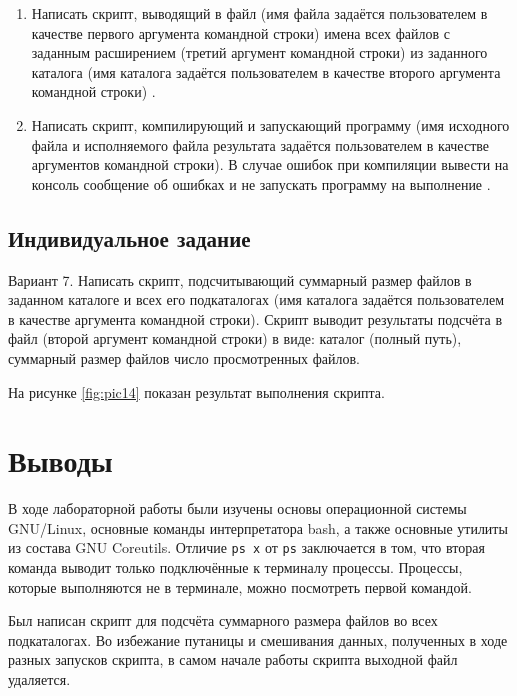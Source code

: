 \begin{enumerate}[listparindent=\fivecharsapprox]

	\item Написать скрипт, выводящий в файл (имя файла задаётся пользователем в качестве первого аргумента командной строки) имена всех файлов с заданным расширением (третий аргумент командной строки) из заданного каталога (имя каталога задаётся пользователем в качестве второго аргумента командной строки) .


	\item Написать скрипт, компилирующий и запускающий программу (имя исходного файла и исполняемого файла результата задаётся пользователем в качестве аргументов командной строки).
В случае ошибок при компиляции вывести на консоль сообщение об ошибках и не запускать программу на выполнение .


\end{enumerate}

\subsection{Индивидуальное задание}
\label{sec:job:personal_task}

Вариант 7. Написать скрипт, подсчитывающий суммарный размер файлов в заданном
каталоге и всех его подкаталогах (имя каталога задаётся пользователем в
качестве аргумента командной строки). Скрипт выводит результаты подсчёта
в файл (второй аргумент командной строки) в виде: каталог (полный путь),
суммарный размер файлов число просмотренных файлов.



На рисунке \ref{fig:pic14} показан результат выполнения скрипта.


\section{Выводы}
\label{sec:out}

В ходе лабораторной работы были изучены основы операционной системы GNU/Linux, основные команды интерпретатора bash, а также основные утилиты из состава GNU Coreutils. Отличие \lstinline{ps x} от \lstinline{ps} заключается в том, что вторая команда выводит только подключённые к терминалу процессы. Процессы, которые выполняются не в терминале, можно посмотреть первой командой.

Был написан скрипт для подсчёта суммарного размера файлов во всех подкаталогах. Во избежание путаницы и смешивания данных, полученных в ходе разных запусков скрипта, в самом начале работы скрипта выходной файл удаляется.
